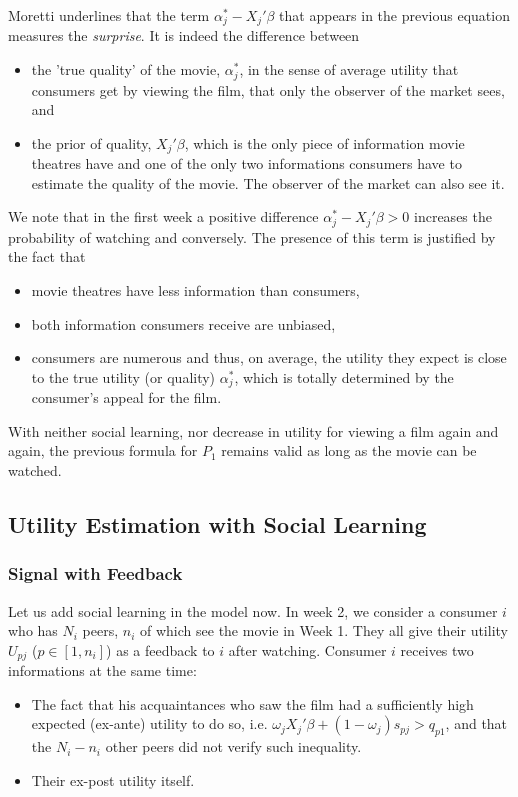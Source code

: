 	Moretti underlines that the term $\alpha_{j}^{*}-X_{j}'\beta$ that appears in the previous equation measures the \textit{surprise}. It is indeed the difference between
	\begin{itemize}
		\item the 'true quality' of the movie, $\alpha_{j}^{*}$, in the sense of average utility that consumers get by viewing the film, that only the observer of the market sees, and
		\item the prior of quality, $X_{j}'\beta$, which is the only piece of information movie theatres have and one of the only two informations consumers have to estimate the quality of the movie. The observer of the market can also see it.
	\end{itemize}

	We note that in the first week a positive difference $\alpha_{j}^{*}-X_{j}'\beta>0$ increases the probability of watching and conversely. The presence of this term is justified by the fact that
	\begin{itemize}
		\item movie theatres have less information than consumers,
		\item both information consumers receive are unbiased,
		\item consumers are numerous and thus, on average, the utility they expect is close to the true utility (or quality) $\alpha_{j}^{*}$, which is totally determined by the consumer's appeal for the film.
	\end{itemize}

	With neither social learning, nor decrease in utility for viewing a film again and again, the previous formula for $P_{1}$ remains valid as long as the movie can be watched.
	
	\subsection{Utility Estimation with Social Learning}	
	
	\subsubsection{Signal with Feedback}
	Let us add social learning in the model now. In week 2, we consider a consumer $i$ who has $N_{i}$ peers, $n_{i}$ of which see the movie in Week 1. They all give their utility $U_{p j }$ ($p\in[1,n_{i}]$) as a feedback to $i$ after watching. Consumer $i$ receives two informations at the same time:
	\begin{itemize}
		\item The fact that his acquaintances who saw the film had a sufficiently high expected (ex-ante) utility to do so, i.e. $\omega_{j} X_{j}'\beta+(1-\omega_{j})s_{p j}>q_{p 1}$, and that the $N_{i}-n_{i}$ other peers did not verify such inequality.
		\item Their ex-post utility itself.
	\end{itemize}

